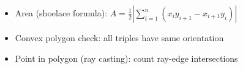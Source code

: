\begin{itemize}
  \item Area (shoelace formula): $A = \frac{1}{2}\left|\sum_{i=1}^{n} (x_i y_{i+1} - x_{i+1} y_i)\right|$
  \item Convex polygon check: all triples have same orientation
  \item Point in polygon (ray casting): count ray-edge intersections
\end{itemize}
